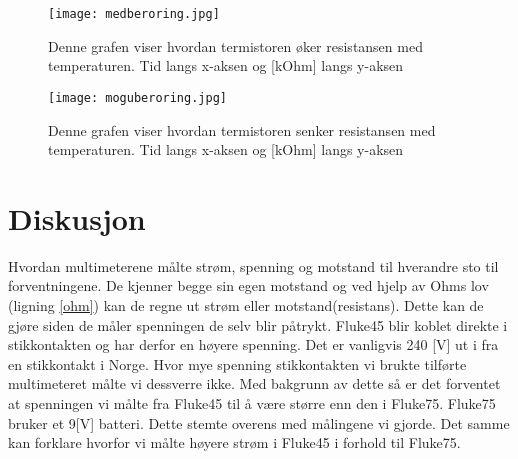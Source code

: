 \documentclass[norsk,a4paper,12pt]{article}
\begin{document}
\begin{figure}
	\begin{center}
  	\texttt{[image: medberoring.jpg]}\\
 	\caption[Termistor med berøring]{Denne grafen viser hvordan termistoren øker resistansen med 
	temperaturen. Tid langs x-aksen og [kOhm] langs y-aksen}
	\label{mberoring}
	\end{center}
\end{figure}

\begin{figure}
	\begin{center}
  	\texttt{[image: moguberoring.jpg]}\\
 	\caption[Termistor etter beroring]{Denne grafen viser hvordan termistoren senker resistansen 
	med temperaturen. Tid langs x-aksen og [kOhm] langs y-aksen}
	\label{moguberoring}
	\end{center}
\end{figure}

\newpage

\section{Diskusjon}
Hvordan multimeterene målte strøm, spenning og motstand til hverandre sto til forventningene. De kjenner begge sin egen motstand og ved hjelp av Ohms lov (ligning \ref{ohm}) kan de regne ut strøm eller motstand(resistans). Dette kan de gjøre siden de måler spenningen de selv blir påtrykt. Fluke45 blir koblet direkte i stikkontakten og har derfor en høyere spenning. Det er vanligvis 240 [V] ut i fra en stikkontakt i Norge. Hvor mye spenning stikkontakten vi brukte tilførte multimeteret målte vi dessverre ikke. Med bakgrunn av dette så er det forventet at spenningen vi målte fra Fluke45 til å være større enn den i Fluke75. Fluke75 bruker et 9[V] batteri. Dette stemte overens med målingene vi gjorde. Det samme kan forklare hvorfor vi målte høyere strøm i Fluke45 i forhold til Fluke75.
\end{document}

